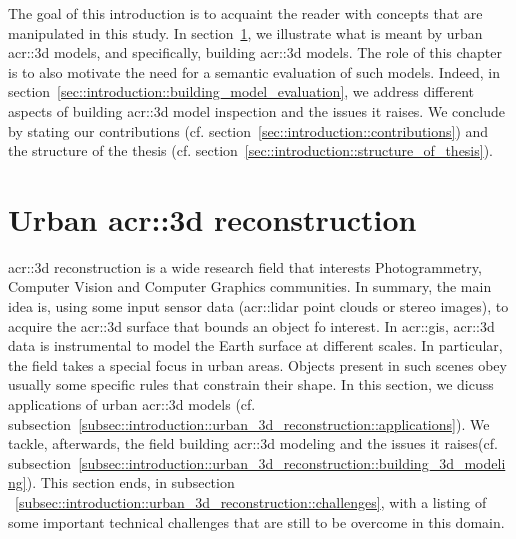 \minitoc

\vfill

The goal of this introduction is to acquaint the reader with concepts that are manipulated in this study.
In section~\ref{sec::introduction::urban_3d_reconstruction}, we illustrate what is meant by urban \gls{acr::3d} models, and specifically,  building \gls{acr::3d} models.
The role of this chapter is to also motivate the need for a semantic evaluation of such models.
Indeed, in section~\ref{sec::introduction::building_model_evaluation}, we address different aspects of building \gls{acr::3d} model inspection and the issues it raises.
We conclude by stating our contributions (cf. section~\ref{sec::introduction::contributions}) and the structure of the thesis (cf. section~\ref{sec::introduction::structure_of_thesis}).

\clearpage

\section{Urban \acrshort*{acr::3d} reconstruction}
    \label{sec::introduction::urban_3d_reconstruction}
    \gls{acr::3d} reconstruction is a wide research field that interests Photogrammetry, Computer Vision and Computer Graphics communities.
    In summary, the main idea is, using some input sensor data (\gls{acr::lidar} point clouds or stereo images), to acquire the \gls{acr::3d} surface that bounds an object fo interest.
    In \gls{acr::gis}, \gls{acr::3d} data is instrumental to model the Earth surface at different scales.
    In particular, the field takes a special focus in urban areas.
    Objects present in such scenes obey usually some specific rules that constrain their shape.
    In this section, we dicuss applications of urban \gls{acr::3d} models (cf. subsection~\ref{subsec::introduction::urban_3d_reconstruction::applications}).
    We tackle, afterwards, the field  building \gls{acr::3d} modeling and the issues it raises(cf. subsection~\ref{subsec::introduction::urban_3d_reconstruction::building_3d_modeling}).
    This section ends, in subsection ~\ref{subsec::introduction::urban_3d_reconstruction::challenges}, with a listing of some important technical challenges that are still to be overcome in this domain.

